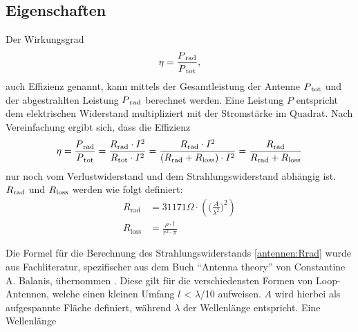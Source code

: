 \subsection{Eigenschaften\label{antennen:antennenEigenschaften}}
Der Wirkungsgrad
\begin{equation}
	\eta=\frac{P\textsubscript{rad}}{P\textsubscript{tot}},
	\label{antennen:Wirkungsgrad}
\end{equation}
auch Effizienz genannt, kann mittels der Gesamtleistung der Antenne $P\textsubscript{tot}$ und der abgestrahlten Leistung $P\textsubscript{rad}$ berechnet werden. Eine Leistung $P$ entspricht dem elektrischen Widerstand multipliziert mit der Stromstärke im Quadrat. Nach Vereinfachung ergibt sich, dass die Effizienz
\begin{equation}
	\eta=\frac{P\textsubscript{rad}}{P\textsubscript{tot}}=\frac{R\textsubscript{rad}\cdot{I^2}}{R\textsubscript{tot}\cdot{I^2}}=\frac{R\textsubscript{rad}\cdot{I^2}}{(R\textsubscript{rad}+R\textsubscript{loss})\cdot{I^2}}=\frac{R\textsubscript{rad}}{R\textsubscript{rad}+R\textsubscript{loss}}
	\label{antennen:Wirkungsgradkomplett}
\end{equation}
nur noch vom Verlustwiderstand und dem Strahlungswiderstand abhängig ist. $R\textsubscript{rad}$ und $R\textsubscript{loss}$ werden wie folgt definiert:
\begin{align}
	R_{\text{rad}} &= 31171 \Omega \cdot \left( \bigg( \frac{A}{\lambda^2} \bigg)^2 \right) \tag{20.3} \label{antennen:Rrad} \\
	R_{\text{loss}} &= \frac{\rho \cdot l}{r^2 \cdot \pi} \tag{20.4} \label{antennen:Rloss}
\end{align}

Die Formel für die Berechnung des Strahlungswiderstands \eqref{antennen:Rrad} wurde aus Fachliteratur, spezifischer aus dem Buch ``Antenna theory'' von Constantine A. Balanis, übernommen \cite{antennen:antennaTheory}. Diese gilt für die verschiedensten Formen von Loop-Antennen, welche einen kleinen Umfang  $l$ < $\lambda$/10 aufweisen. $A$ wird hierbei als aufgespannte Fläche definiert, während $\lambda$ der Wellenlänge entspricht. Eine Wellenlänge 
\setcounter{equation}{4}

